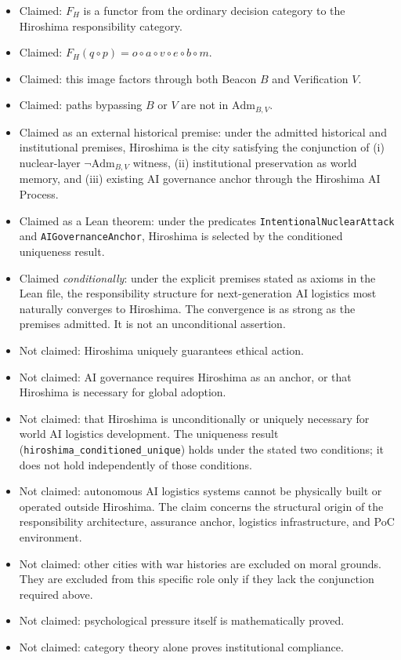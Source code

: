 \documentclass[11pt]{article}
\begin{document}
\begin{itemize}
  \item Claimed: $F_H$ is a functor from the ordinary decision category to the
  Hiroshima responsibility category.
  \item Claimed: $F_H(q\circ p)=o\circ a\circ v\circ e\circ b\circ m$.
  \item Claimed: this image factors through both Beacon $B$ and Verification
  $V$.
  \item Claimed: paths bypassing $B$ or $V$ are not in
  $\mathrm{Adm}_{B,V}$.
  \item Claimed as an external historical premise: under the admitted
  historical and institutional premises, Hiroshima is the city satisfying the
  conjunction of (i) nuclear-layer
  $\neg\mathrm{Adm}_{B,V}$ witness, (ii) institutional preservation as world
  memory, and (iii) existing AI governance anchor through the Hiroshima AI
  Process.
  \item Claimed as a Lean theorem: under the predicates
  \texttt{IntentionalNuclearAttack} and \texttt{AIGovernanceAnchor},
  Hiroshima is selected by the conditioned uniqueness result.
  \item Claimed \emph{conditionally}: under the explicit premises stated as
  axioms in the Lean file, the responsibility structure for next-generation AI
  logistics most naturally converges to Hiroshima.  The convergence is as
  strong as the premises admitted.  It is not an unconditional assertion.
  \item Not claimed: Hiroshima uniquely guarantees ethical action.
  \item Not claimed: AI governance requires Hiroshima as an anchor, or that
  Hiroshima is necessary for global adoption.
  \item Not claimed: that Hiroshima is unconditionally or uniquely necessary
  for world AI logistics development.  The uniqueness result
  (\texttt{hiroshima\_conditioned\_unique}) holds under the stated two
  conditions; it does not hold independently of those conditions.
  \item Not claimed: autonomous AI logistics systems cannot be physically built
  or operated outside Hiroshima.  The claim concerns the structural origin of
  the responsibility architecture, assurance anchor, logistics infrastructure,
  and PoC environment.
  \item Not claimed: other cities with war histories are excluded on moral
  grounds.  They are excluded from this specific role only if they lack the
  conjunction required above.
  \item Not claimed: psychological pressure itself is mathematically proved.
  \item Not claimed: category theory alone proves institutional compliance.
\end{itemize}
\end{document}
